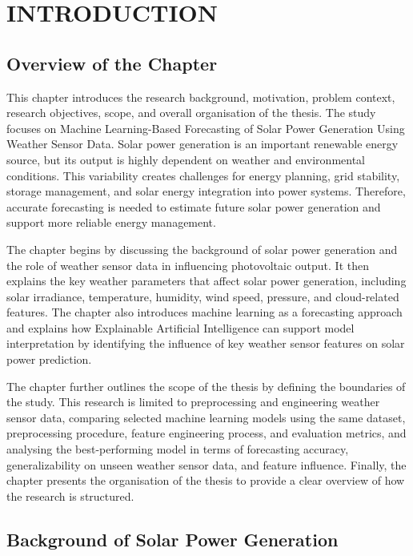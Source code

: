 \chapter{INTRODUCTION}

\section{Overview of the Chapter}

This chapter introduces the research background, motivation, problem context, research objectives, scope, and overall organisation of the thesis. 
The study focuses on Machine Learning-Based Forecasting of Solar Power Generation Using Weather Sensor Data. Solar power generation is an important renewable energy source, but its output is highly dependent on weather and environmental conditions. 
This variability creates challenges for energy planning, grid stability, storage management, and solar energy integration into power systems. Therefore, accurate forecasting is needed to estimate future solar power generation and support more reliable energy management.

The chapter begins by discussing the background of solar power generation and the role of weather sensor data in influencing photovoltaic output. It then explains the key weather parameters that affect solar power generation, including solar irradiance, temperature, humidity, wind speed, pressure, and cloud-related features. The chapter also introduces machine learning as a forecasting approach and explains how Explainable Artificial Intelligence can support model interpretation by identifying the influence of key weather sensor features on solar power prediction.

The chapter further outlines the scope of the thesis by defining the boundaries of the study. This research is limited to preprocessing and engineering weather sensor data, comparing selected machine learning models using the same dataset, preprocessing procedure, feature engineering process, and evaluation metrics, and analysing the best-performing model in terms of forecasting accuracy, generalizability on unseen weather sensor data, and feature influence. Finally, the chapter presents the organisation of the thesis to provide a clear overview of how the research is structured.

\section{Background of Solar Power Generation}

